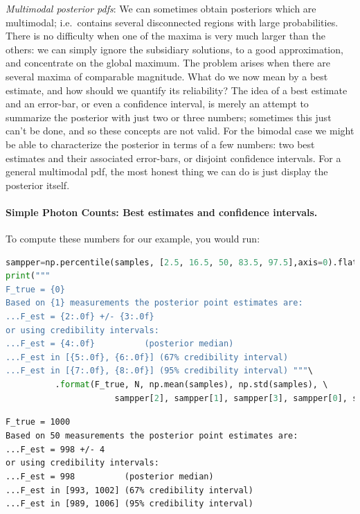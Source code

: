 \documentclass[%
oneside,                 %
final,                   %
10pt]{article}
\begin{document}
\emph{Multimodal posterior pdfs}: We can sometimes obtain posteriors which are multimodal; i.e.~contains several disconnected regions with large probabilities. There is no difficulty when one of the maxima is very much larger than the others: we can simply ignore the subsidiary solutions, to a good approximation, and concentrate on the global maximum. The problem arises when there are several maxima of comparable magnitude. What do we now mean by a best estimate, and how should we quantify its reliability? The idea of a best estimate and an error-bar, or even a confidence interval, is merely an attempt to summarize the posterior with just two or three numbers; sometimes this just can’t be done, and so these concepts are not valid. For the bimodal case we might be able to characterize the posterior in terms of a few numbers: two best estimates and their associated error-bars, or disjoint confidence intervals. For a general multimodal pdf, the most honest thing we can do is just display the posterior itself.

\paragraph{Simple Photon Counts: Best estimates and confidence intervals.}
To compute these numbers for our example, you would run:

\begin{lstlisting}[language=Python,style=blue1]
sampper=np.percentile(samples, [2.5, 16.5, 50, 83.5, 97.5],axis=0).flatten()
print("""
F_true = {0}
Based on {1} measurements the posterior point estimates are:
...F_est = {2:.0f} +/- {3:.0f}
or using credibility intervals:
...F_est = {4:.0f}          (posterior median) 
...F_est in [{5:.0f}, {6:.0f}] (67% credibility interval) 
...F_est in [{7:.0f}, {8:.0f}] (95% credibility interval) """\ 
          .format(F_true, N, np.mean(samples), np.std(samples), \ 
                      sampper[2], sampper[1], sampper[3], sampper[0], sampper[4]))
\end{lstlisting}
\Verb!F_true = 1000! \\
\texttt{Based on 50 measurements the posterior point estimates are:} \\
\Verb!...F_est = 998 +/- 4! \\
\texttt{or using credibility intervals:} \\
\Verb!...F_est = 998          (posterior median)!  \\
\Verb!...F_est in [993, 1002] (67% credibility interval)!  \\
\Verb!...F_est in [989, 1006] (95% credibility interval)!  \\
\end{document}
